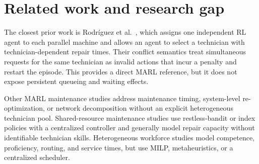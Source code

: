 \documentclass[11pt]{article}
\begin{document}
\section{Related work and research gap}

The closest prior work is Rodríguez et al.~\cite{rodriguez2022}, which assigns one independent RL agent to each parallel machine and allows an agent to select a technician with technician-dependent repair times. Their conflict semantics treat simultaneous requests for the same technician as invalid actions that incur a penalty and restart the episode. This provides a direct MARL reference, but it does not expose persistent queueing and waiting effects.

Other MARL maintenance studies address maintenance timing, system-level re-optimization, or network decomposition without an explicit heterogeneous technician pool. Shared-resource maintenance studies use restless-bandit or index policies with a centralized controller and generally model repair capacity without identifiable technician skills. Heterogeneous workforce studies model competence, proficiency, routing, and service times, but use MILP, metaheuristics, or a centralized scheduler.
\end{document}
